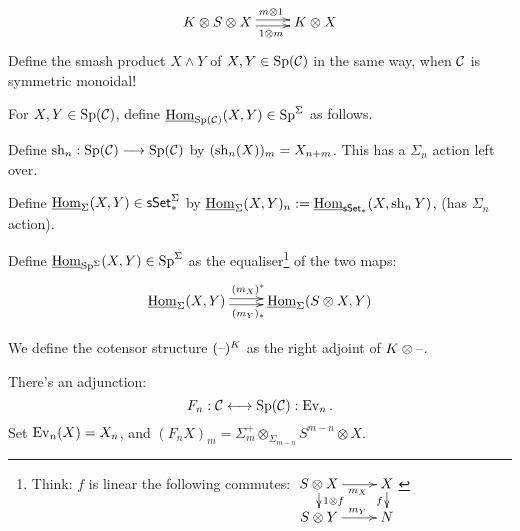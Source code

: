 \begin{MichaelStableModelCats}
\begin{itemise}
\[\xymatrix{
K\otimes S\otimes X\ar@<.5ex>[r]^{\ \ m\otimes 1}\ar@<-.5ex>[r]_{\ \ 1\otimes m}&K\otimes X
}\]
Define the smash product $X\wedge Y$ of $X,Y\in\operatorname{Sp}(\mathcal{C})$ in the same way, when $\mathcal{C}$ is symmetric monoidal!
\item For $X,Y\in\operatorname{Sp}(\mathcal{C})$, define $\operatorname{\underline{Hom}}_{\operatorname{Sp}(\mathcal{C})}(X,Y)\in \operatorname{Sp}^\Sigma$ as follows.
\begin{itemise}
\item Define $\operatorname{sh}_n:\operatorname{Sp}(\mathcal{C})\longrightarrow\operatorname{Sp}(\mathcal{C})$ by $(\operatorname{sh}_n(X))_m=X_{n+m}$. This has a $\Sigma_n$ action left over.
\item Define $\operatorname{\underline{Hom}}_\Sigma(X,Y)\in\operatorname{{\mathsf{sSet}}}_*^\Sigma$ by $\operatorname{\underline{Hom}}_\Sigma(X,Y)_n:=\operatorname{\underline{Hom}}_{\operatorname{{\mathsf{sSet}}}_*}(X,\operatorname{sh}_nY)$, (has $\Sigma_n$ action).%
\item Define $\operatorname{\underline{Hom}}_{\operatorname{Sp}^\Sigma}(X,Y)\in\operatorname{Sp}^\Sigma$ as the equaliser\footnote{Think: $f$ is linear \Iff the following commutes: $\xymatrix@R=1em{
\ar[d]^{1\otimes f}S\otimes X\ar[r]_{\ \ m_X}&X\ar[d]_f\\
S\otimes Y\ar[r]^{\ \ m_Y}&N
}$} of the two maps:
\[\xymatrix{
\intHom_\Sigma(X,Y)\ar@<.5ex>[r]^{(m_X)^*\ \ }\ar@<-.5ex>[r]_{(m_Y)_*\ \ }&\intHom_\Sigma(S\otimes X,Y)
}\]
\end{itemise}
\item We define the cotensor structure $(\textup{--})^K$ as the right adjoint of $K\otimes\textup{--}$.
\item There's an adjunction:
\[F_n:\mathcal{C}\longleftrightarrow\operatorname{Sp}(\mathcal{C}):\operatorname{Ev}_n.\]
Set $\operatorname{Ev}_n(X)=X_n$, and $(F_nX)_m=\Sigma_m^+\otimes_{\Sigma_{m-n}}S^{m-n}\otimes X$. 
\end{itemise}

\end{MichaelStableModelCats}
